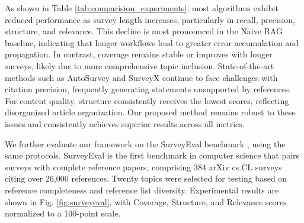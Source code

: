 \documentclass[manuscript,review,anonymous]{acmart}
\begin{document}
As shown in Table \ref{tab:comparision_experiments}, most algorithms exhibit reduced performance as survey length increases, particularly in recall, precision, structure, and relevance. This decline is most pronounced in the Naive RAG baseline, indicating that longer workflows lead to greater error accumulation and propagation. In contrast, coverage remains stable or improves with longer surveys, likely due to more comprehensive topic inclusion. State-of-the-art methods such as AutoSurvey and SurveyX continue to face challenges with citation precision, frequently generating statements unsupported by references. For content quality, structure consistently receives the lowest scores, reflecting disorganized article organization. Our proposed method remains robust to these issues and consistently achieves superior results across all metrics.

We further evaluate our framework on the SurveyEval benchmark \cite{wang2025llm}, using the same protocols. SurveyEval is the first benchmark in computer science that pairs surveys with complete reference papers, comprising 384 arXiv cs.CL surveys citing over 26,000 references. Twenty topics were selected for testing based on reference completeness and reference list diversity. Experimental results are shown in Fig. \ref{fig:surveyeval}, with Coverage, Structure, and Relevance scores normalized to a 100-point scale.
\end{document}
